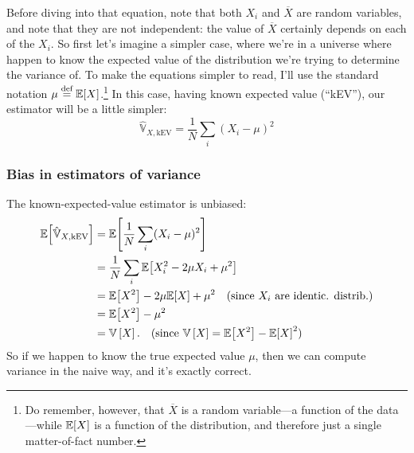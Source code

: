 Before diving into that equation, note that both $X_i$ and $\overline{X}$ are
random variables, and note that they are not independent: the value of
$\overline{X}$ certainly depends on each of the $X_i$. So first let's imagine
a simpler case, where we're in a universe where happen to know the expected
value of the distribution we're trying to determine the variance of. To make
the equations simpler to read, I'll use the standard notation $\mu \stackrel{\text{def}}{=}
\mathbb{E}\!\left[{X}\right]$.\footnote{Do remember, however, that $\overline{X}$ is a random
variable---a function of the data---while $\mathbb{E}\!\left[{X}\right]$ is a function of the
distribution, and therefore just a single matter-of-fact number.} In this
case, having known expected value (``kEV''), our estimator will be a little
simpler:
\begin{equation}
\hat{\mathbb{V}}_{X,\mathrm{kEV}} = \frac{1}{N} \sum_i ( X_i - \mu )^2
\end{equation}

\subsubsection{Bias in estimators of variance}

The known-expected-value estimator is unbiased:
\begin{align*}
\expect{\hat{\mathbb{V}}_{X,\mathrm{kEV}}}
  &= \expect{\frac{1}{N} \sum_i ( X_i - \mu )^2} \\
  &= \frac{1}{N} \sum_i \expect{X_i^2 - 2\mu X_i + \mu^2} \\
  &= \expect{X^2} - 2 \mu \expect{X} + \mu^2 \quad\text{(since $X_i$ are identic. distrib.)} \\
  &= \expect{X^2} - \mu^2 \\
  &= \var{X}. \quad\text{(since $\var{X} = \expect{X^2} - \expect{X}^2$)}
\end{align*}
So if we happen to know the true expected value $\mu$, then we can compute
variance in the naive way, and it's exactly correct.

